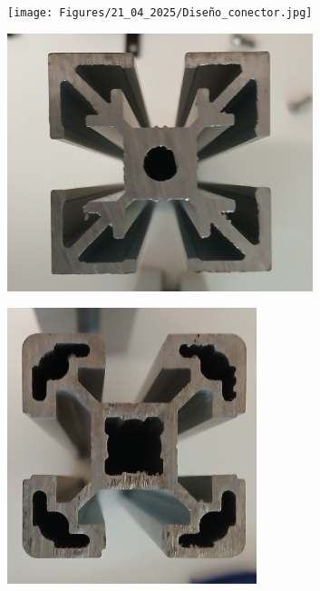 \begin{figure}[!ht]
	\begin{minipage}[c]{0.5\textwidth}
			\begin{subfigure}{\textwidth}
					\centering
					\texttt{[image: Figures/21\_04\_2025/Diseño\_conector.jpg]}
					\captionsetup{width=0.8\textwidth}
				\end{subfigure}
		\end{minipage}\begin{minipage}[c]{0.249\textwidth}
			\begin{subfigure}{\textwidth}
					\centering
					\includegraphics[width=0.98\textwidth]{Figures/21_04_2025/Perfil_1.jpg}
					\captionsetup{width=0.8\textwidth}
				\end{subfigure}
		\end{minipage}\begin{minipage}[c]{0.249\textwidth}
			\begin{subfigure}{\textwidth}
				\centering
				\includegraphics[width=0.8\textwidth]{Figures/21_04_2025/Perfil_2.jpg}

\end{subfigure}
\end{minipage}
\end{figure}
